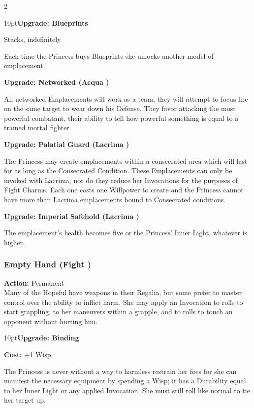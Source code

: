 \begin{multicols}{2}
 \begin{myindentpar}{10pt}\textbf{Upgrade: Blueprints}

Stacks, indefinitely

Each time the Princess buys Blueprints she unlocks another model of emplacement. 

\textbf{Upgrade: Networked (Acqua \textbullet\textbullet)}

All networked Emplacements will work as a team, they will attempt to focus fire on the same target to wear down his Defense. They favor attacking the most powerful combatant, their ability to tell how powerful something is equal to a trained mortal fighter. 

\textbf{Upgrade: Palatial Guard (Lacrima \textbullet\textbullet)}

The Princess may create emplacements within a consecrated area which will last for as long as the Consecrated Condition. These Emplacements can only be invoked with Lacrima, nor do they reduce her Invocations for the purposes of Fight Charms. Each one costs one Willpower to create and the Princess cannot have more than Lacrima emplacements bound to Consecrated conditions. 

\textbf{Upgrade: Imperial Safehold (Lacrima \textbullet\textbullet)}

The emplacement's health becomes five or the Princess' Inner Light, whatever is higher. 

\end{myindentpar}

\subsubsection*{Empty Hand (Fight \textbullet)}

\noindent \textbf{Action:} Permanent \\

\noindent Many of the Hopeful have weapons in their Regalia, but some prefer to master control over the ability to inflict harm. She may apply an Invocation to rolls to start grappling, to her maneuvers within a grapple, and to rolls to touch an opponent without hurting him.

\begin{myindentpar}{10pt}\textbf{Upgrade: Binding}

\textbf{Cost:} +1 Wisp. 

The Princess is never without a way to harmless restrain her foes for she can manifest the necessary equipment by spending a Wisp; it has a Durability equal to her Inner Light or any applied Invocation. She must still roll like normal to tie her target up. 


\end{myindentpar}
\end{multicols}
